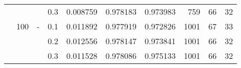 \begin{table}[h!]
\begin{tabular}{llllrrrrrr}
          &     &   & 0.3 &  0.008759 &     0.978183 &     0.973983 &     759 &          66 &        32 \\
          & 100 & - & 0.1 &  0.011892 &     0.977919 &     0.972826 &    1001 &          67 &        33 \\
          &     &   & 0.2 &  0.012556 &     0.978147 &     0.973841 &    1001 &          66 &        32 \\
          &     &   & 0.3 &  0.011528 &     0.978086 &     0.975133 &    1001 &          66 &        32 \\
\bottomrule
\end{tabular}
\end{table}
